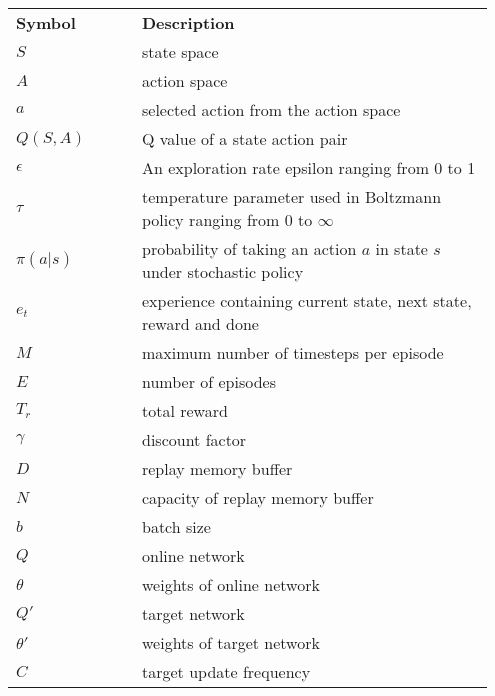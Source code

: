 \documentclass{article}
\begin{document}
\begin{tabular}{@{}p{0.25\linewidth}p{0.7\linewidth}@{}} 
\textbf{Symbol} & \textbf{Description} \\
$S$ & state space \\
$A$ & action space \\
$a$ & selected action from the action space  \\
$Q(S,A)$ & Q value of a state action pair \\
$\epsilon$ & An exploration rate epsilon ranging from 0 to 1 \\
$\tau$ & temperature parameter used in Boltzmann policy ranging from 0 to $\infty$ \\
$\pi(a|s)$ & probability of taking an action $a$ in state $s$ under stochastic policy\\
$e_t$ & experience containing current state, next state, reward and done \\
$M$ & maximum number of timesteps per episode \\
$E$ & number of episodes \\
$T_r$ & total reward \\
$\gamma$ & discount factor \\
$D$ & replay memory buffer \\
$N$ & capacity of replay memory buffer \\
$b$ & batch size \\
$Q$ & online network \\
$\theta$ & weights of online network \\
$Q'$ & target network \\
$\theta'$ & weights of target network \\
$C$ & target update frequency \\



\end{tabular}
\end{document}
